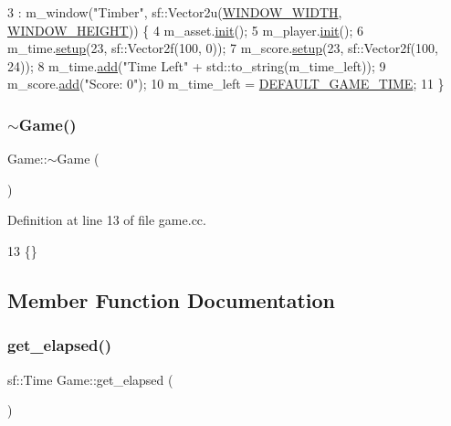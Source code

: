 \begin{DoxyCode}
3            : m\_window(\textcolor{stringliteral}{"Timber"}, sf::Vector2u(\hyperlink{game_8h_a498d9f026138406895e9a34b504ac6a6}{WINDOW\_WIDTH}, 
      \hyperlink{game_8h_a5473cf64fa979b48335079c99532e243}{WINDOW\_HEIGHT})) \{
4     m\_asset.\hyperlink{class_assets_a1e07c9e1ddf47daf66001d887df95c7b}{init}();
5     m\_player.\hyperlink{class_player_a015ea21fa1e7273e47d48cb20d9b12e3}{init}();
6     m\_time.\hyperlink{class_text_afde89d05e0de0f17092b8c56e6ac77df}{setup}(23, sf::Vector2f(100, 0));
7     m\_score.\hyperlink{class_text_afde89d05e0de0f17092b8c56e6ac77df}{setup}(23, sf::Vector2f(100, 24));
8     m\_time.\hyperlink{class_text_ab5f6fabb3e5e029ed0e42d21757c9521}{add}(\textcolor{stringliteral}{"Time Left"} + std::to\_string(m\_time\_left));
9     m\_score.\hyperlink{class_text_ab5f6fabb3e5e029ed0e42d21757c9521}{add}(\textcolor{stringliteral}{"Score: 0"});
10     m\_time\_left = \hyperlink{game_8h_a0edfb2481ef7bcfb3e2e942a936a98d9}{DEFAULT\_GAME\_TIME};
11 \}
\end{DoxyCode}
\mbox{\label{class_game_ae3d112ca6e0e55150d2fdbc704474530}} 
\subsubsection{\texorpdfstring{$\sim$\+Game()}{~Game()}}
{\footnotesize\ttfamily Game\+::$\sim$\+Game (\begin{DoxyParamCaption}{ }\end{DoxyParamCaption})}



Definition at line 13 of file game.\+cc.


\begin{DoxyCode}
13 \{\}
\end{DoxyCode}


\subsection{Member Function Documentation}
\mbox{\label{class_game_a4924f7fafddc76b267d1dc9138fa07d0}} 
\subsubsection{\texorpdfstring{get\+\_\+elapsed()}{get\_elapsed()}}
{\footnotesize\ttfamily sf\+::\+Time Game\+::get\+\_\+elapsed (\begin{DoxyParamCaption}{ }\end{DoxyParamCaption})}



